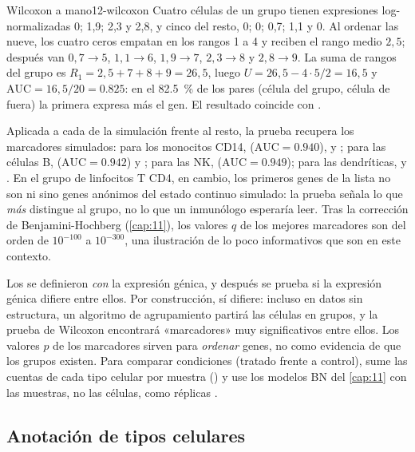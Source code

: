 \begin{ejemplo}{Wilcoxon a mano}{12-wilcoxon}
Cuatro células de un grupo tienen expresiones log-normalizadas 0; 1,9; 2,3 y 2,8, y cinco del resto, 0; 0; 0,7; 1,1 y 0. Al ordenar las nueve, los cuatro ceros empatan en los rangos 1 a 4 y reciben el rango medio $2{,}5$; después van $0{,}7\to5$, $1{,}1\to6$, $1{,}9\to7$, $2{,}3\to8$ y $2{,}8\to9$. La suma de rangos del grupo es $R_1=2{,}5+7+8+9=26{,}5$, luego $U=26{,}5-4\cdot5/2=16{,}5$ y $\mathrm{AUC}=16{,}5/20=\num{0.825}$: en el \SI{82.5}{\percent} de los pares (célula del grupo, célula de fuera) la primera expresa más el gen. El resultado coincide con .
\end{ejemplo}

Aplicada a cada  de la simulación frente al resto, la prueba recupera los marcadores simulados: para los monocitos CD14,  ($\mathrm{AUC}=\num{0.940}$),  y ; para las células B,  ($\mathrm{AUC}=\num{0.942}$) y ; para las NK,  ($\mathrm{AUC}=\num{0.949}$); para las dendríticas,  y . En el grupo de linfocitos T CD4, en cambio, los primeros genes de la lista no son  ni  sino genes anónimos del estado continuo simulado: la prueba señala lo que \emph{más} distingue al grupo, no lo que un inmunólogo esperaría leer. Tras la corrección de Benjamini-Hochberg (\cref{cap:11}), los valores $q$ de los mejores marcadores son del orden de $10^{-100}$ a $10^{-300}$, una ilustración de lo poco informativos que son en este contexto.

\begin{cuidado}
Los  se definieron \emph{con} la expresión génica, y después se prueba si la expresión génica difiere entre ellos. Por construcción, sí difiere: incluso en datos sin estructura, un algoritmo de agrupamiento partirá las células en grupos, y la prueba de Wilcoxon encontrará «marcadores» muy significativos entre ellos. Los valores $p$ de los marcadores sirven para \emph{ordenar} genes, no como evidencia de que los grupos existen. Para comparar condiciones (tratado frente a control), sume las cuentas de cada tipo celular por muestra () y use los modelos BN del \cref{cap:11} con las muestras, no las células, como réplicas \parencite{c12-heumos2023}.
\end{cuidado}

\subsection{Anotación de tipos celulares}

